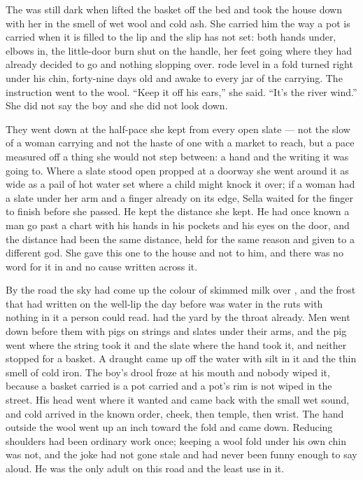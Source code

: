 
The  was still dark when  lifted the basket off the bed and took the house down with her in the smell of wet wool and cold ash. She carried him the way a pot is carried when it is filled to the lip and the slip has not set: both hands under, elbows in, the little-door burn shut on the handle, her feet going where they had already decided to go and nothing slopping over.  rode level in a fold turned right under his chin, forty-nine days old and awake to every jar of the carrying. The instruction went to the wool. “Keep it off his ears,” she said. “It's the river wind.” She did not say the boy and she did not look down.

They went down  at the half-pace she kept from every open slate --- not the slow of a woman carrying and not the haste of one with a market to reach, but a pace measured off a thing she would not step between: a hand and the writing it was going to. Where a slate stood open propped at a doorway she went around it as wide as a pail of hot water set where a child might knock it over; if a woman had a slate under her arm and a finger already on its edge, Sella waited for the finger to finish before she passed. He kept the distance she kept. He had once known a man go past a chart with his hands in his pockets and his eyes on the door, and the distance had been the same distance, held for the same reason and given to a different god. She gave this one to the house and not to him, and there was no word for it in  and no cause written across it.

By the road the sky had come up the colour of skimmed milk over , and the frost that had written on the well-lip the day before was water in the ruts with nothing in it a person could read.  had the yard by the throat already. Men went down before them with pigs on strings and slates under their arms, and the pig went where the string took it and the slate where the hand took it, and neither stopped for a basket. A draught came up off the water with silt in it and the thin smell of cold iron. The boy's drool froze at his mouth and nobody wiped it, because a basket carried is a pot carried and a pot's rim is not wiped in the street. His head went where it wanted and came back with the small wet sound, and cold arrived in the known order, cheek, then temple, then wrist. The hand outside the wool went up an inch toward the fold and came down. Reducing shoulders had been ordinary work once; keeping a wool fold under his own chin was not, and the joke had not gone stale and had never been funny enough to say aloud. He was the only adult on this road and the least use in it.

